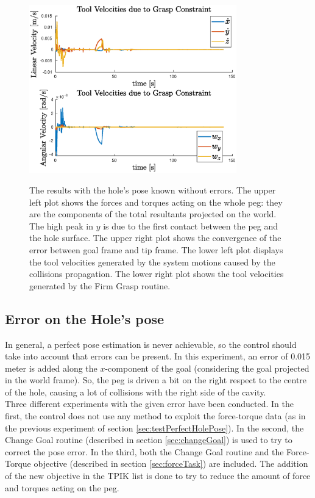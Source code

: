 \begin{figure}[H]
{		\includegraphics[width=9cm]{NOERROR/grasp.eps}
	}
	\caption[Plots with Perfectly known Hole's pose]{The results with the hole's pose known without errors. The upper left plot shows the forces and torques acting on the whole peg: they are the components of the total resultants projected on the world. The high peak in $y$ is due to the first contact between the peg and the hole surface. The upper right plot shows the convergence of the error between goal frame and tip frame. The lower left plot displays the tool velocities generated by the system motions caused by the collisions propagation. The lower right plot shows the tool velocities generated by the Firm Grasp routine.}
	\label{fig:noErrorPlots}
\end{figure}


\subsection{Error on the Hole's pose}
\label{subsec:resultsControlError}
In general, a perfect pose estimation is never achievable, so the control should take into account that errors can be present. In this experiment, an error of 0.015 meter is added along the $x$-component of the goal (considering the goal projected in the world frame). So, the peg is driven a bit on the right respect to the centre of the hole, causing a lot of collisions with the right side of the cavity.\\

Three different experiments with the given error have been conducted. In the first, the control does not use any method to exploit the force-torque data (as in the previous experiment of section \ref{sec:testPerfectHolePose}). In the second, the Change Goal routine (described in section \ref{sec:changeGoal}) is used to try to correct the pose error. In the third, both the Change Goal routine and the Force-Torque objective (described in section \ref{sec:forceTask}) are included. The addition of the new objective in the TPIK list is done to try to reduce the amount of force and torques acting on the peg.

